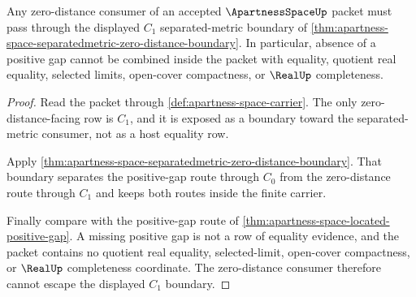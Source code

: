 \begin{theorem}
\label{thm:apartness-space-zero-distance-nonescape}
Any zero-distance consumer of an accepted $\ApartnessSpaceUp$ packet must pass
through the displayed $C_1$ separated-metric boundary of
\autoref{thm:apartness-space-separatedmetric-zero-distance-boundary}. In
particular, absence of a positive gap cannot be combined inside the packet
with equality, quotient real equality, selected limits, open-cover compactness,
or $\RealUp$ completeness.
\end{theorem}
\begin{proof}
Read the packet through \autoref{def:apartness-space-carrier}. The only
zero-distance-facing row is $C_1$, and it is exposed as a boundary toward the
separated-metric consumer, not as a host equality row.

Apply \autoref{thm:apartness-space-separatedmetric-zero-distance-boundary}.
That boundary separates the positive-gap route through $C_0$ from the
zero-distance route through $C_1$ and keeps both routes inside the finite
carrier.

Finally compare with the positive-gap route of
\autoref{thm:apartness-space-located-positive-gap}. A missing positive gap is
not a row of equality evidence, and the packet contains no quotient real
equality, selected-limit, open-cover compactness, or $\RealUp$ completeness
coordinate. The zero-distance consumer therefore cannot escape the displayed
$C_1$ boundary.
\end{proof}

